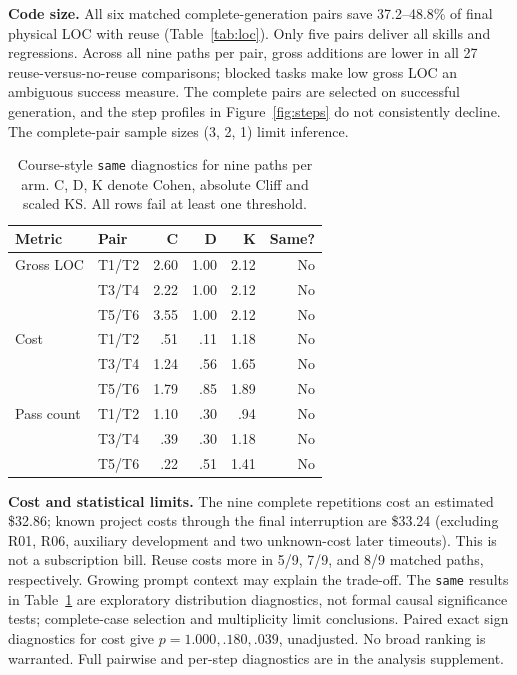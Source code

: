 \documentclass[sigconf,nonacm]{acmart}
\begin{document}
\textbf{Code size.} All six matched complete-generation pairs save 37.2--48.8\% of final physical LOC with reuse (Table~\ref{tab:loc}). Only five pairs deliver all skills and regressions. Across all nine paths per pair, gross additions are lower in all 27 reuse-versus-no-reuse comparisons; blocked tasks make low gross LOC an ambiguous success measure. The complete pairs are selected on successful generation, and the step profiles in Figure~\ref{fig:steps} do not consistently decline. The complete-pair sample sizes (3, 2, 1) limit inference.
\begin{table}[t]
\caption{Course-style \texttt{same} diagnostics for nine paths per arm. C, D, K denote Cohen, absolute Cliff and scaled KS. All rows fail at least one threshold.}\label{tab:same}\centering\scriptsize
\begin{tabular}{@{}llrrrr@{}}\toprule
Metric & Pair & C & D & K & Same?\\\midrule
Gross LOC&T1/T2&2.60&1.00&2.12&No\\
&T3/T4&2.22&1.00&2.12&No\\
&T5/T6&3.55&1.00&2.12&No\\
Cost&T1/T2&.51&.11&1.18&No\\
&T3/T4&1.24&.56&1.65&No\\
&T5/T6&1.79&.85&1.89&No\\
Pass count&T1/T2&1.10&.30&.94&No\\
&T3/T4&.39&.30&1.18&No\\
&T5/T6&.22&.51&1.41&No\\\bottomrule
\end{tabular}
\end{table}
\textbf{Cost and statistical limits.} The nine complete repetitions cost an estimated \$32.86; known project costs through the final interruption are \$33.24 (excluding R01, R06, auxiliary development and two unknown-cost later timeouts). This is not a subscription bill. Reuse costs more in 5/9, 7/9, and 8/9 matched paths, respectively. Growing prompt context may explain the trade-off. The \texttt{same} results in Table~\ref{tab:same} are exploratory distribution diagnostics, not formal causal significance tests; complete-case selection and multiplicity limit conclusions. Paired exact sign diagnostics for cost give $p=1.000,.180,.039$, unadjusted. No broad ranking is warranted. Full pairwise and per-step diagnostics are in the analysis supplement.
\end{document}

